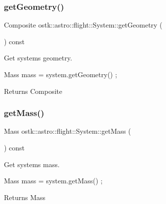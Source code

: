 \subsubsection{\texorpdfstring{get\+Geometry()}{getGeometry()}}
{\footnotesize\ttfamily Composite ostk\+::astro\+::flight\+::\+System\+::get\+Geometry (\begin{DoxyParamCaption}{ }\end{DoxyParamCaption}) const}



Get system\textquotesingle{}s geometry. 


\begin{DoxyCode}
Mass mass = system.getGeometry() ;
\end{DoxyCode}


\begin{DoxyReturn}{Returns}
Composite 
\end{DoxyReturn}
\mbox{\label{classostk_1_1astro_1_1flight_1_1_system_a5c83b22d462c5d4b3f9766430c17d646}} 
\subsubsection{\texorpdfstring{get\+Mass()}{getMass()}}
{\footnotesize\ttfamily Mass ostk\+::astro\+::flight\+::\+System\+::get\+Mass (\begin{DoxyParamCaption}{ }\end{DoxyParamCaption}) const}



Get system\textquotesingle{}s mass. 


\begin{DoxyCode}
Mass mass = system.getMass() ;
\end{DoxyCode}


\begin{DoxyReturn}{Returns}
Mass 
\end{DoxyReturn}
\mbox{\label{classostk_1_1astro_1_1flight_1_1_system_a45d6ad6bca50c0d9cb9b50135ed2efa3}} 
